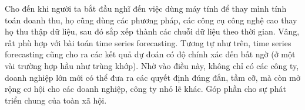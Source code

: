 \bigskip
Cho đến khi người ta bắt đầu nghĩ đến việc dùng máy tính để thay mình tính toán doanh thu, họ cũng dùng các phương pháp, các công cụ công nghệ cao thay họ thu thập dữ liệu, sau đó sắp xếp thành các chuỗi dữ liệu theo thời gian. Vâng, rất phù hợp với bài toán time series forecasting. Tương tự như trên, time series forecasting cũng cho ra các kết quả dự đoán có độ chính xác đến bất ngờ (ở một vài trường hợp hầu như trùng khớp). Nhờ vào điều này, không chỉ có các công ty, doanh nghiệp lớn mới có thể đưa ra các quyết định đúng đắn, tầm cỡ, mà còn mở rộng cơ hội cho các doanh nghiệp, công ty nhỏ lẽ khác. Góp phần cho sự phát triển chung của toàn xã hội.

